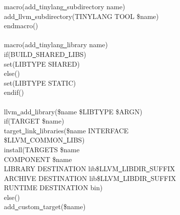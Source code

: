 \begin{tcolorbox}[colback=white,colframe=black]
macro(add\underline{~}tinylang\underline{~}subdirectory name) \\
\hspace*{0.5cm}add\underline{~}llvm\underline{~}subdirectory(TINYLANG TOOL \${name}) \\
endmacro() \\
\\
macro(add\underline{~}tinylang\underline{~}library name) \\
\hspace*{0.5cm}if(BUILD\underline{~}SHARED\underline{~}LIBS) \\
\hspace*{1cm}set(LIBTYPE SHARED) \\
\hspace*{0.5cm}else() \\
\hspace*{1cm}set(LIBTYPE STATIC) \\
\hspace*{0.5cm}endif() \\
\\
\hspace*{0.5cm}llvm\underline{~}add\underline{~}library(\${name} \${LIBTYPE} \${ARGN}) \\
\hspace*{0.5cm}if(TARGET \${name}) \\
\hspace*{1cm}target\underline{~}link\underline{~}libraries(\${name} INTERFACE  \\
\hspace*{1.5cm}\${LLVM\underline{~}COMMON\underline{~}LIBS})  \\
\hspace*{1cm}install(TARGETS \${name}  \\
\hspace*{1.5cm}COMPONENT \${name} \\
\hspace*{1.5cm}LIBRARY DESTINATION lib\${LLVM\underline{~}LIBDIR\underline{~}SUFFIX} \\
\hspace*{1.5cm}ARCHIVE DESTINATION lib\${LLVM\underline{~}LIBDIR\underline{~}SUFFIX} \\
\hspace*{1.5cm}RUNTIME DESTINATION bin) \\
\hspace*{0.5cm}else() \\
\hspace*{1cm}add\underline{~}custom\underline{~}target(\${name}) \\

\end{tcolorbox}
